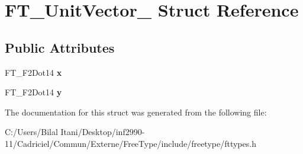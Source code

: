 \hypertarget{struct_f_t___unit_vector__}{}\section{F\+T\+\_\+\+Unit\+Vector\+\_\+ Struct Reference}
\label{struct_f_t___unit_vector__}
\subsection*{Public Attributes}
\begin{DoxyCompactItemize}
\item 
F\+T\+\_\+\+F2\+Dot14 {\bfseries x}\hypertarget{struct_f_t___unit_vector___a03c9f8ae35a5ad1bcac49995a9dac714}{}\label{struct_f_t___unit_vector___a03c9f8ae35a5ad1bcac49995a9dac714}

\item 
F\+T\+\_\+\+F2\+Dot14 {\bfseries y}\hypertarget{struct_f_t___unit_vector___a12eb9ad5c47614f5f2d3f9e401933d0e}{}\label{struct_f_t___unit_vector___a12eb9ad5c47614f5f2d3f9e401933d0e}

\end{DoxyCompactItemize}


The documentation for this struct was generated from the following file\+:\begin{DoxyCompactItemize}
\item 
C\+:/\+Users/\+Bilal Itani/\+Desktop/inf2990-\/11/\+Cadriciel/\+Commun/\+Externe/\+Free\+Type/include/freetype/fttypes.\+h\end{DoxyCompactItemize}
